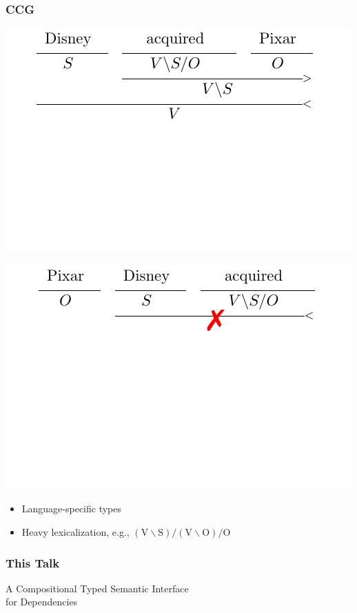 \documentclass[mathserif,12pt]{beamer}
\begin{document}
\begin{frame}
\frametitle{CCG}
\centering
\includegraphics[trim=0em 10em 1em 0em,clip=true,scale=1.3]{figures/ccg-transitive-svo}

\vspace{2em}
\includegraphics[trim=0em 10.5em 1em 0em,clip=true,scale=1.3]{figures/ccg-transitive-osv-derivation}

\large
\begin{itemize}
 \item Language-specific types
 \item Heavy lexicalization, e.g., $\mathrm{(V\backslash S)/ (V\backslash O)/O}$
\end{itemize}
\end{frame}

\begin{frame}
 \frametitle{This Talk}
 \Large \centering
 
 A Compositional Typed Semantic Interface \\
 for Dependencies
 
\end{frame}
\end{document}
